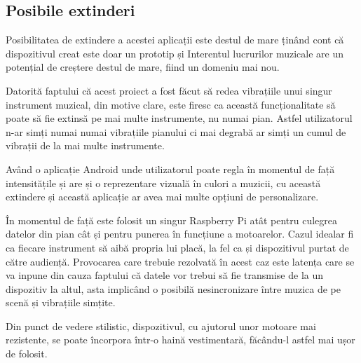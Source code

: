 \documentclass[../IoMusT.tex]{subfiles}
\begin{document}
\subsection{Posibile extinderi}
Posibilitatea de extindere a acestei aplicații este destul de mare ținând cont că dispozitivul creat este doar un prototip și Interentul lucrurilor mu\-zi\-ca\-le are un potențial de creștere destul de mare, fiind un domeniu mai nou.
\\
\par Datorită faptului că acest proiect a fost făcut să redea vibrațiile unui singur instrument muzical, din motive clare, este firesc ca această funcționalitate să poate să fie extinsă pe mai multe instrumente, nu numai pian. Astfel utilizatorul n-ar simți numai numai vibrațiile pianului ci mai degrabă ar simți un cumul de vibrații de la mai multe instrumente. 
\\
\par Având o aplicație Android unde utilizatorul poate regla în momentul de față intensitățile și are și o reprezentare vizuală în culori a muzicii, cu această extindere și această aplicație ar avea mai multe opțiuni de personalizare.
\\
 \par În momentul de față este folosit un singur Raspberry Pi atât pentru culegrea datelor din pian cât și pentru punerea în funcțiune a motoarelor. Cazul idealar fi ca fiecare instrument să aibă propria lui placă, la fel ca și dispozitivul purtat de către audiență. Provocarea care trebuie rezolvată în acest caz este latența care se va inpune din cauza faptului că datele vor trebui să fie transmise de la un dispozitiv la altul, asta implicând o posibilă nesincronizare între muzica de pe scenă și vibrațiile simțite. 
\\
\par Din punct de vedere stilistic, dispozitivul, cu ajutorul unor motoare mai rezistente, se poate încorpora într-o haină vestimentară, făcându-l astfel mai ușor de folosit.
\end{document}

